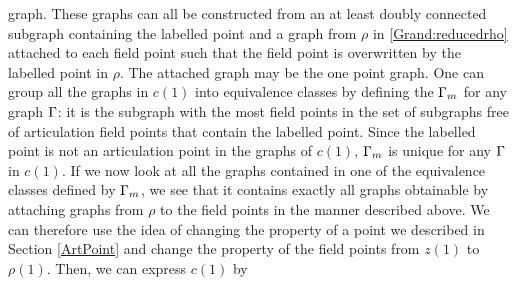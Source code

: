 \documentclass[8.5pt,twoside,twocolumn]{article}
\theoremstyle{standard}
\begin{document}
graph.
These graphs can all be constructed from an at least doubly connected
subgraph containing the labelled point and a graph from $\rho$ in
\eqref{Grand:reducedrho} attached to each field point such that the field point
is overwritten by the labelled point in $\rho$. The attached graph may be the
one point graph. One can group all the graphs in $c(1)$ into equivalence
classes by defining the  $\Gamma_m$ for any graph
$\Gamma$: it is the subgraph with the most field points in the set of subgraphs
free of articulation field points that contain the labelled point. Since the
labelled point is not an articulation point in the graphs of $c(1)$, $\Gamma_m$ is
unique for any $\Gamma$ in $c(1)$. If we now look at all the graphs contained in
one of the equivalence classes defined by $\Gamma_m$, we see that it contains
exactly all graphs obtainable by attaching graphs from $\rho$ to the field
points in the manner described above. We can therefore use the idea of changing
the property of a point we described in Section \ref{ArtPoint} and change the
property of the field points from $z(1)$ to $\rho(1)$. Then, we can express $c(1)$ by
\end{document}
